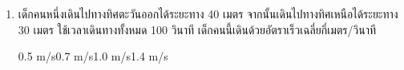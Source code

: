 \begin{enumerate}
	\item  \nonet เด็กคนหนึ่งเดินไปทางทิศตะวันออกได้ระยะทาง  40  เมตร  จากนั้นเดินไปทางทิศเหนือได้ระยะทาง  30  เมตร  ใช้เวลาเดินทางทั้งหมด  100  วินาที  เด็กคนนี้เดินด้วยอัตราเร็วเฉลี่ยกี่เมตร/วินาที \runningj
	\begin{2c}
		{0.5 m/s}{0.7 m/s}{1.0 m/s}{1.4 m/s}
	\end{2c}
\end{enumerate}
